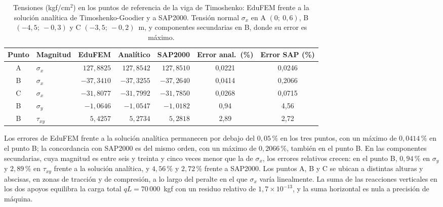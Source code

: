 \begin{table}[htbp]
\centering
\caption[Tensiones (kgf/cm$^2$) en los puntos de referencia de la viga de Timoshenko: EduFEM frente a la solución analítica y a SAP2000.]{Tensiones (kgf/cm$^2$) en los puntos de referencia de la viga de Timoshenko: EduFEM frente a la solución analítica de Timoshenko-Goodier y a SAP2000. Tensión normal $\sigma_x$ en A $(0;\ 0{,}6)$, B $(-4{,}5;\ -0{,}3)$ y C $(-3{,}5;\ -0{,}2)$~m, y componentes secundarias en B, donde su error es máximo.}
\label{tab:timoshenko-stress}
\small
\setlength{\tabcolsep}{4pt}
\begin{tabular}{c l r r r c c}
\hline
Punto & Magnitud & EduFEM & Analítico & SAP2000 & Error anal.\ (\%) & Error SAP (\%) \\
\hline
A & $\sigma_x$   & $127{,}8825$ & $127{,}8542$ & $127{,}8510$ & 0,0221 & 0,0246 \\
B & $\sigma_x$   & $-37{,}3410$ & $-37{,}3255$ & $-37{,}2640$ & 0,0414 & 0,2066 \\
C & $\sigma_x$   & $-31{,}8077$ & $-31{,}7992$ & $-31{,}7850$ & 0,0268 & 0,0715 \\
B & $\sigma_y$   & $-1{,}0646$  & $-1{,}0547$  & $-1{,}0182$  & 0,94   & 4,56 \\
B & $\tau_{xy}$  & $5{,}4257$   & $5{,}2734$   & $5{,}2818$   & 2,89   & 2,72 \\
\hline
\end{tabular}
{\singlespacing{}}
\end{table}

Los errores de EduFEM frente a la solución analítica permanecen por debajo del $0{,}05\,\%$ en los tres puntos, con un máximo de $0{,}0414\,\%$ en el punto B; la concordancia con SAP2000 es del mismo orden, con un máximo de $0{,}2066\,\%$, también en el punto B. En las componentes secundarias, cuya magnitud es entre seis y treinta y cinco veces menor que la de $\sigma_x$, los errores relativos crecen: en el punto B, $0{,}94\,\%$ en $\sigma_y$ y $2{,}89\,\%$ en $\tau_{xy}$ frente a la solución analítica, y $4{,}56\,\%$ y $2{,}72\,\%$ frente a SAP2000. Los puntos A, B y C se ubican a distintas alturas y abscisas, en zonas de tracción y de compresión, a lo largo del peralte en el que $\sigma_x$ varía linealmente. La suma de las reacciones verticales en los dos apoyos equilibra la carga total $qL = 70\,000$~kgf con un residuo relativo de $1{,}7\times10^{-13}$, y la suma horizontal es nula a precisión de máquina.

